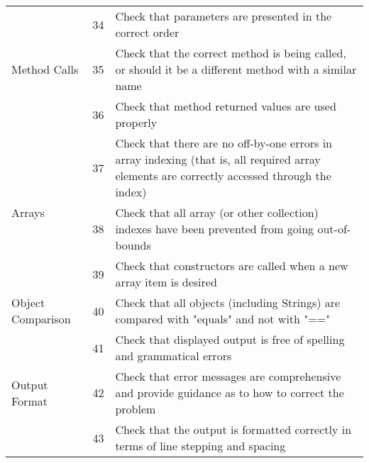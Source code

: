 \documentclass[11pt, a4paper,titlepage]{article}
\begin{document}
									\begin{tabularx}{\textwidth}{| X | l | X |}
										\hline
										
	\multirow{3}{*}{Method Calls}		& \label{itm:34} 34 &  
										Check that parameters are presented in the correct order
										\\	\cline{2-3}
										& \label{itm:35} 35 &  
										Check that the correct method is being called, or should it be a different
										method with a similar name
										\\	\cline{2-3}
										& \label{itm:36} 36 & 
										Check that method returned values are used properly 
										\\   \hline
	\multirow{3}{*}{Arrays}				& \label{itm:37} 37 &  
										Check that there are no off-by-one errors in array indexing (that is, all
										required array elements are correctly accessed through the index)
										\\	\cline{2-3}
										& \label{itm:38} 38 &  
										Check that all array (or other collection) indexes have been prevented
										from going out-of-bounds
										\\	\cline{2-3}
										& \label{itm:39} 39 &  
										Check that constructors are called when a new array item is desired
										\\   \hline
	\multirow{1}{*}{Object Comparison} 	& \label{itm:40} 40 &  
										Check that all objects (including Strings) are compared with "equals" and
										not with "=="
										\\	\hline
	\multirow{3}{*}{Output Format}		& \label{itm:41} 41 &  
										Check that displayed output is free of spelling and grammatical errors
										\\	\cline{2-3}
										& \label{itm:42} 42 &  
										Check that error messages are comprehensive and provide guidance as to
										how to correct the problem
										\\	\cline{2-3}
										& \label{itm:43} 43 &  
										Check that the output is formatted correctly in terms of line stepping and
										spacing
										\\   \hline	
									\end{tabularx}
									
\end{document}
